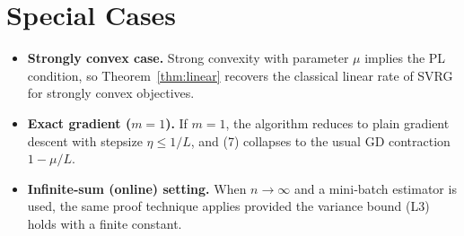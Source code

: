 \documentclass{article}
\begin{document}
\section*{Special Cases}
\begin{itemize}
\item \textbf{Strongly convex case.} Strong convexity with parameter $\mu$ implies the PL condition, so Theorem~\ref{thm:linear} recovers the classical linear rate of SVRG for strongly convex objectives.
\item \textbf{Exact gradient ($m=1$).} If $m=1$, the algorithm reduces to plain gradient descent with stepsize $\eta\le1/L$, and (7) collapses to the usual GD contraction $1-\mu/L$.
\item \textbf{Infinite‑sum (online) setting.} When $n\to\infty$ and a mini‑batch estimator is used, the same proof technique applies provided the variance bound (L3) holds with a finite constant.
\end{itemize}
\end{document}
